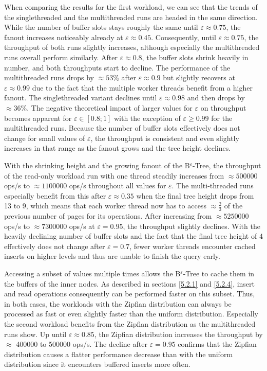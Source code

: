 When comparing the results for the first workload, we can see that the trends of the singlethreaded and the multithreaded runs are headed in the same direction. While the number of buffer slots stays roughly the same until $\varepsilon \approx 0.75$, the fanout increases noticeably already at $\varepsilon \approx 0.45$. Consequently, until $\varepsilon \approx 0.75$, the throughput of both runs slightly increases, although especially the multithreaded runs overall perform similarly. After $\varepsilon \approx 0.8$, the buffer slots shrink heavily in number, and both throughputs start to decline. The performance of the multithreaded runs drops by $\approx 53\%$ after $\varepsilon \approx 0.9$ but slightly recovers at $\varepsilon \approx 0.99$ due to the fact that the multiple worker threads benefit from a higher fanout. The singlethreaded variant declines until $\varepsilon \approx 0.98$ and then drops by $\approx 36\%$. The negative theoretical impact of larger values for $\varepsilon$ on throughput becomes apparent for $\varepsilon \in [0.8; 1]$ with the exception of $\varepsilon \geq 0.99$ for the multithreaded runs. Because the number of buffer slots effectively does not change for small values of $\varepsilon$, the throughput is consistent and even slightly increases in that range as the fanout grows and the tree height declines.

With the shrinking height and the growing fanout of the B$^\varepsilon$-Tree, the throughput of the read-only workload run with one thread steadily increases from $\approx 500000$ ops/s to $\approx 1100000$ ops/s throughout all values for $\varepsilon$. The multi-threaded runs especially benefit from this after $\varepsilon \approx 0.35$ when the final tree height drops from 13 to 9, which means that each worker thread now has to access $\approx \frac{2}{3}$ of the previous number of pages for its operations. After increasing from $\approx 5250000$ ops/s to $\approx 7300000$ ops/s at $\varepsilon=0.95$, the throughput slightly declines. With the heavily declining number of buffer slots and the fact that the final tree height of 4 effectively does not change after $\varepsilon=0.7$, fewer worker threads encounter cached inserts on higher levels and thus are unable to finish the query early.

Accessing a subset of values multiple times allows the B$^\varepsilon$-Tree to cache them in the buffers of the inner nodes. As described in sections \ref{5.2.1} and \ref{5.2.4}, insert and read operations consequently can be performed faster on this subset. Thus, in both cases, the workloads with the Zipfian distribution can always be processed as fast or even slightly faster than the uniform distribution. Especially the second workload benefits from the Zipfian distribution as the multithreaded runs show. Up until $\varepsilon \approx 0.85$, the Zipfian distribution increases the throughput by $\approx$ 400000 to 500000 ops/s. The decline after $\varepsilon=0.95$ confirms that the Zipfian distribution causes a flatter performance decrease than with the uniform distribution since it encounters buffered inserts more often.

